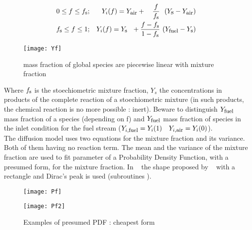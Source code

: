\begin{eqnarray}
\displaystyle 0         \le f \le f_{\mbox{\footnotesize s}} &;& Y_{i}(f) = Y_{\mbox{\footnotesize air}} + \quad \frac{f}{f_{\mbox{\footnotesize s}}} ~~ (Y_{\mbox{s}}-Y_{\mbox{\footnotesize air}})  \\
\displaystyle f_{\mbox{\footnotesize s}} \le f \le 1         &;& Y_{i}(f) = Y_{\mbox{\footnotesize s}}~~ + \frac{f-f_{\mbox{\footnotesize s}}}{1-f_{\mbox{\footnotesize s}}}~(Y_{\mbox{\footnotesize fuel}}-Y_{\mbox{\footnotesize s}})
\end{eqnarray}

\begin{figure}[ht]
\centerline{\texttt{[image: Yf]}}
\caption{mass fraction of global species are piecewise linear with mixture fraction}
\end{figure}
  
Where $f_{\mbox{\footnotesize s}}$ is the stoechiometric mixture fraction, $Y_s$
the concentrations in products of the complete reaction of a stoechiometric
mixture (in such products, the chemical reaction is no more possible :
inert). Beware to distinguish $Y_{\mbox{\footnotesize fuel}}$ mass fraction of a
species (depending on f) and $Y_{\mbox{\footnotesize fuel}}$ mass fraction of
species in
the inlet condition for the fuel stream ($Y_{i,\mbox{\footnotesize fuel}} = Y_{i}(1) \quad Y_{i,\mbox{\footnotesize air}} = Y_{i}(0)$). \\
The diffusion model uses two equations for the mixture fraction and its
variance. Both of them having no reaction term. The mean and the variance of the
mixture fraction are used to fit parameter of a Probability Density Function,
with a presumed form, for the mixture fraction. In \CS~ the shape proposed by
~\cite{2} with a rectangle and Dirac's peak is used (subroutines ).
 
\begin{figure}[h]
\centerline{\texttt{[image: Pf]}}
\centerline{\texttt{[image: Pf2]}}
\caption{Examples of presumed PDF : cheapest form}
\end{figure}
  
